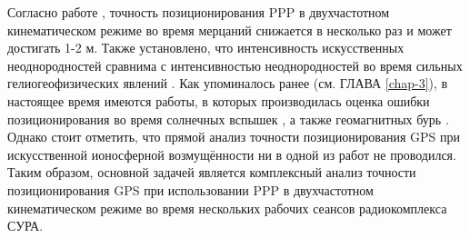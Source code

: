 Согласно работе \cite{Marques2018}, точность позиционирования PPP в двухчастотном кинематическом режиме во время мерцаний снижается в несколько раз и может достигать 1-2 м.
Также установлено, что интенсивность искусственных неоднородностей сравнима с интенсивностью неоднородностей во время сильных гелиогеофизических явлений \cite{Frolov2017}.
Как упоминалось ранее (см. ГЛАВА \ref{chap-3}), в настоящее время имеются работы, в которых производилась оценка ошибки позиционирования во время солнечных вспышек \cite{Yasyukevich2018}, а также геомагнитных бурь \cite{Jacobsen2012, Bergeot2011, Lejeune2012, Jacobsen2016, Luo2018}.
Однако стоит отметить, что прямой анализ точности позиционирования GPS при искусственной ионосферной возмущённости ни в одной из работ не проводился.   
Таким образом, основной задачей является комплексный анализ точности позиционирования GPS при использовании PPP в двухчастотном кинематическом режиме во время нескольких рабочих сеансов радиокомплекса СУРА.